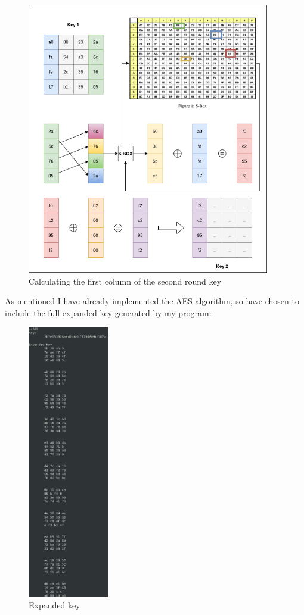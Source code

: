 \documentclass{article}
\begin{document}
\begin{figure}[H]
 \centering
  \includegraphics[width=300pt]{img/AESKey2.png}
 \caption{Calculating the first column of the second round key}
 \end{figure}
\newpage
As mentioned I have already implemented the AES algorithm, so have chosen to include the full expanded key generated by my program:
\begin{figure}[H]
 \centering
  \includegraphics[width=100pt]{img/AESFullKey.png}
 \caption{Expanded key}
 \end{figure}
\end{document}
